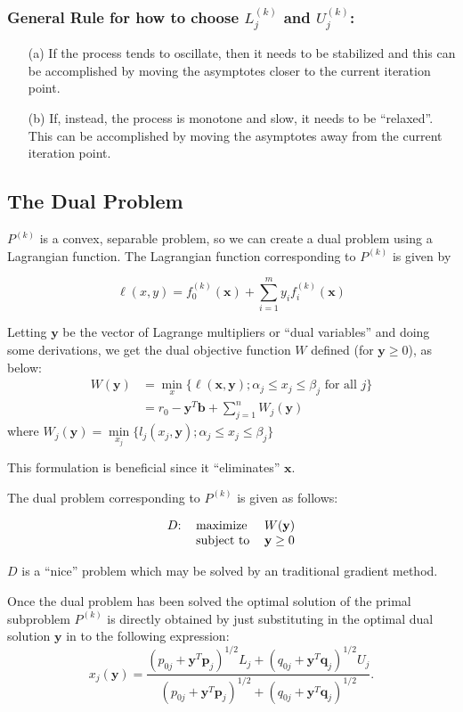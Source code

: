 \subsubsection*{General Rule for how to choose $L_j^{(k)}$ and $U_j^{(k)}$:}
\begin{itemize}
	\item[(a)] If the process tends to oscillate, then it needs to be stabilized and this can be accomplished by moving the asymptotes closer to the current iteration point.
	\item[(b)] If, instead, the process is monotone and slow, it needs to be ``relaxed''. This can be accomplished by moving the asymptotes away from the current iteration point.
\end{itemize}

\subsection{The Dual Problem}

$P^{(k)}$ is a convex, separable problem, so we can create a dual problem using a Lagrangian function. The Lagrangian function corresponding to $P^{(k)}$ is given by 

$$\ell(x,y)=f_0^{(k)}(\mathbf{x})+\sum\limits_{i=1}^{m}y_if_i^{(k)}(\mathbf{x})$$

Letting $\mathbf{y}$ be the vector of Lagrange multipliers or ``dual variables'' and doing some derivations, we get the dual objective function $W$ defined (for $\mathbf{y}\geq 0$), as below:
\begin{align*}
	W(\mathbf{y}) & =\min\limits_x\lbrace\ell(\mathbf{x},\mathbf{y}); \alpha_j\leq x_j\leq \beta_j\text{ for all }j\rbrace \\
	           & =r_0-\mathbf{y}^T\mathbf{b}+\sum\limits_{j=1}^{n}W_j(\mathbf{y})                                          
\end{align*}
where $W_j(\mathbf{y})=\min\limits_{x_j}\lbrace l_j(x_j,\mathbf{y}); \alpha_j\leq x_j\leq \beta_j\rbrace$

This formulation is beneficial since it ``eliminates'' $\mathbf{x}$.

The dual problem corresponding to $P^{(k)}$ is given as follows:

\begin{equation}
	\begin{tabular}{lll}
		$D$: & maximize   & $W(\mathbf{y})$    \\
		     & subject to & $\mathbf{y}\geq 0$
	\end{tabular}
\end{equation}
                                     
$D$ is a ``nice'' problem which may be solved by an traditional gradient method.

Once the dual problem has been solved the optimal solution of the primal subproblem $P^{(k)}$ is directly obtained by just substituting in the optimal dual solution $\mathbf{y}$ in to the following expression:
$$x_j(\mathbf{y})=\frac{\left(p_{0j}+\mathbf{y}^T\mathbf{p}_j\right)^{1/2}L_j+\left(q_{0j}+\mathbf{y}^T\mathbf{q}_j\right)^{1/2}U_j}{\left(p_{0j}+\mathbf{y}^T\mathbf{p}_j\right)^{1/2}+\left(q_{0j}+\mathbf{y}^T\mathbf{q}_j\right)^{1/2}}.$$